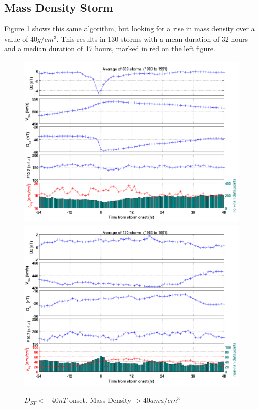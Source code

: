 \documentclass[10pt,twocolumn]{article}
\begin{document}
\subsection{Mass Density Storm}
Figure \ref{MassStorm} shows this same algorithm, but looking for a rise in mass density over a value of 40$g/cm^3$. This results in 130 storms with a mean duration of 32 hours and a median duration of 17 hours, marked in red on the left figure.

\begin{figure}[htp!]
\centering
\includegraphics[scale=0.35]{paperfigures/stormavs-dst.png}
\includegraphics[scale=0.35]{paperfigures/stormavs-mass.png}
\caption{$D_{ST}<-40nT$ onset, Mass Density $>40 amu/cm^3$}
\label{MassStorm}
\end{figure}
\end{document}
